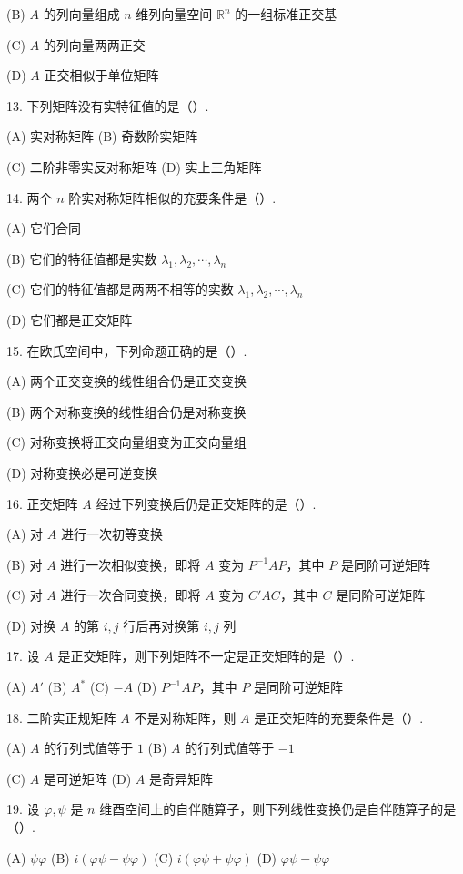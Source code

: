 \documentclass[UTF8, 12pt, fontset=fandol, oneside]{ctexart}
\begin{document}
(B) $A$ 的列向量组成 $n$ 维列向量空间 $\mathbb{R}^n$ 的一组标准正交基

(C) $A$ 的列向量两两正交

(D) $A$ 正交相似于单位矩阵

13. 下列矩阵没有实特征值的是（\quad ）.

(A) 实对称矩阵 \qquad (B) 奇数阶实矩阵

(C) 二阶非零实反对称矩阵 \qquad (D) 实上三角矩阵

14. 两个 $n$ 阶实对称矩阵相似的充要条件是（\quad ）.

(A) 它们合同

(B) 它们的特征值都是实数 $\lambda_1,\lambda_2,\cdots,\lambda_n$

(C) 它们的特征值都是两两不相等的实数 $\lambda_1,\lambda_2,\cdots,\lambda_n$

(D) 它们都是正交矩阵

15. 在欧氏空间中，下列命题正确的是（\quad ）.

(A) 两个正交变换的线性组合仍是正交变换

(B) 两个对称变换的线性组合仍是对称变换

(C) 对称变换将正交向量组变为正交向量组

(D) 对称变换必是可逆变换

16. 正交矩阵 $A$ 经过下列变换后仍是正交矩阵的是（\quad ）.

(A) 对 $A$ 进行一次初等变换

(B) 对 $A$ 进行一次相似变换，即将 $A$ 变为 $P^{-1}AP$，其中 $P$ 是同阶可逆矩阵

(C) 对 $A$ 进行一次合同变换，即将 $A$ 变为 $C'AC$，其中 $C$ 是同阶可逆矩阵

(D) 对换 $A$ 的第 $i,j$ 行后再对换第 $i,j$ 列

17. 设 $A$ 是正交矩阵，则下列矩阵不一定是正交矩阵的是（\quad ）.

(A) $A'$ \qquad (B) $A^*$ \qquad (C) $-A$ \qquad (D) $P^{-1}AP$，其中 $P$ 是同阶可逆矩阵

18. 二阶实正规矩阵 $A$ 不是对称矩阵，则 $A$ 是正交矩阵的充要条件是（\quad ）.

(A) $A$ 的行列式值等于 $1$ \qquad (B) $A$ 的行列式值等于 $-1$

(C) $A$ 是可逆矩阵 \qquad (D) $A$ 是奇异矩阵

19. 设 $\varphi,\psi$ 是 $n$ 维酉空间上的自伴随算子，则下列线性变换仍是自伴随算子的是（\quad ）.

(A) $\psi\varphi$ \qquad (B) $i(\varphi\psi-\psi\varphi)$ \qquad (C) $i(\varphi\psi+\psi\varphi)$ \qquad (D) $\varphi\psi-\psi\varphi$
\end{document}
